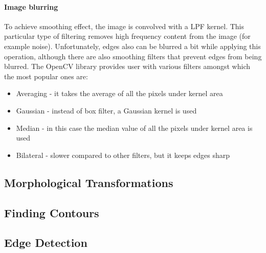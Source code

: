 \paragraph{Image blurring}
To achieve smoothing effect, the image is convolved with a LPF kernel. This particular type of filtering removes high frequency content from the image (for example noise). Unfortunately, edges also can be blurred a bit while applying this operation, although there are also smoothing filters that prevent edges from being blurred. The OpenCV library provides user with various filters amongst which the most popular ones are:
\begin{itemize}
	\item Averaging - it takes the average of all the pixels under kernel area
	\item Gaussian - instead of box filter, a Gaussian kernel is used
	\item Median - in this case the median value of all the pixels under kernel area is used
	\item Bilateral - slower compared to other filters, but it keeps edges sharp
\end{itemize}

\subsection{Morphological Transformations}
\subsection{Finding Contours}

\subsection{Edge Detection}
